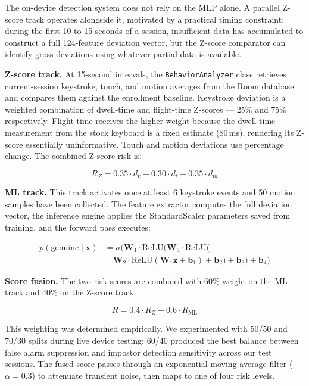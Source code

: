 \documentclass[conference]{IEEEtran}
\begin{document}
The on-device detection system does not rely on the MLP alone. A parallel Z-score track operates alongside it, motivated by a practical timing constraint: during the first 10 to 15 seconds of a session, insufficient data has accumulated to construct a full 124-feature deviation vector, but the Z-score comparator can identify gross deviations using whatever partial data is available.

\textbf{Z-score track.} At 15-second intervals, the \texttt{BehaviorAnalyzer} class retrieves current-session keystroke, touch, and motion averages from the Room database and compares them against the enrollment baseline. Keystroke deviation is a weighted combination of dwell-time and flight-time Z-scores --- 25\% and 75\% respectively. Flight time receives the higher weight because the dwell-time measurement from the stock keyboard is a fixed estimate (80\,ms), rendering its Z-score essentially uninformative. Touch and motion deviations use percentage change. The combined Z-score risk is:

\begin{equation}
R_Z = 0.35 \cdot d_k + 0.30 \cdot d_t + 0.35 \cdot d_m
\end{equation}

\textbf{ML track.} This track activates once at least 6 keystroke events and 50 motion samples have been collected. The feature extractor computes the full deviation vector, the inference engine applies the StandardScaler parameters saved from training, and the forward pass executes:

\begin{equation}
\begin{split}
p(\text{genuine} \mid \mathbf{x}) &= \sigma\!\big(\mathbf{W}_4 \cdot \text{ReLU}(\mathbf{W}_3 \cdot \text{ReLU}( \\
&\quad \mathbf{W}_2 \cdot \text{ReLU}(\mathbf{W}_1 \mathbf{z} + \mathbf{b}_1) + \mathbf{b}_2) + \mathbf{b}_3) + \mathbf{b}_4\big)
\end{split}
\end{equation}

\textbf{Score fusion.} The two risk scores are combined with 60\% weight on the ML track and 40\% on the Z-score track:

\begin{equation}
R = 0.4 \cdot R_Z + 0.6 \cdot R_{\text{ML}}
\end{equation}

This weighting was determined empirically. We experimented with 50/50 and 70/30 splits during live device testing; 60/40 produced the best balance between false alarm suppression and impostor detection sensitivity across our test sessions. The fused score passes through an exponential moving average filter ($\alpha = 0.3$) to attenuate transient noise, then maps to one of four risk levels.
\end{document}
